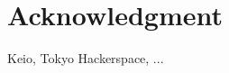 \documentclass[11pt]{article}
\begin{document}
\section*{Acknowledgment}
Keio, Tokyo Hackerspace, ...





% 
% 

\end{document}
